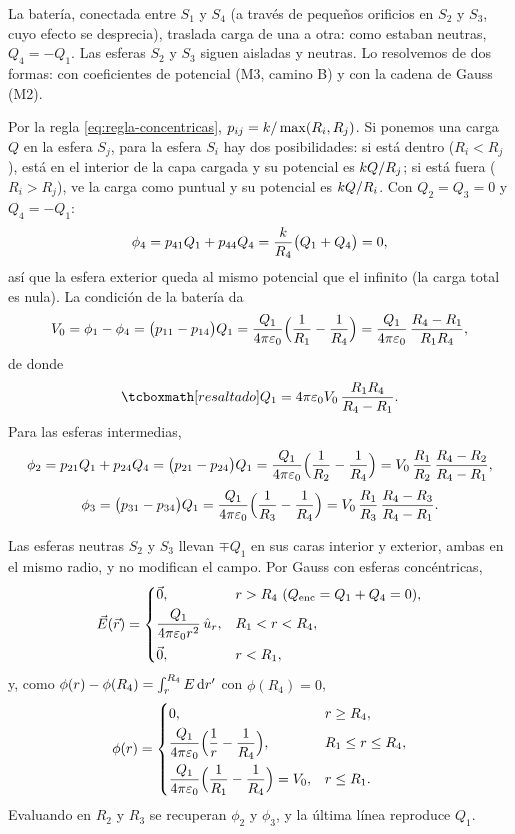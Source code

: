 \begin{resolucion}
 La batería, conectada entre $S_1$ y $S_4$ (a través de pequeños orificios en $S_2$ y $S_3$, cuyo efecto se desprecia), traslada carga de una a otra:
como estaban neutras, $Q_4=-Q_1$. Las esferas $S_2$ y $S_3$ siguen aisladas y neutras. Lo resolvemos de dos formas: con coeficientes de potencial (M3, camino B)
y con la cadena de Gauss (M2).

 Por la regla \eqref{eq:regla-concentricas}, $p_{ij}=k/\max(R_i,R_j)$. Si ponemos una carga $Q$ en la esfera $S_j$,
para la esfera $S_i$ hay dos posibilidades: si está dentro ($R_i<R_j$), está en el interior de la capa cargada y su potencial es $k Q/R_j$; si está fuera
($R_i>R_j$), ve la carga como puntual y su potencial es $k Q/R_i$. Con $Q_2=Q_3=0$ y $Q_4=-Q_1$:
\[
  \phi_4=p_{41}Q_1+p_{44}Q_4=\frac{k}{R_4}\bigl(Q_1+Q_4\bigr)=0 ,
\]
así que la esfera exterior queda al mismo potencial que el infinito (la carga total es nula). La condición de la batería da
\[
  V_0=\phi_1-\phi_4=\bigl(p_{11}-p_{14}\bigr)Q_1=\frac{Q_1}{4\pi\varepsilon_{0}}\Bigl(\frac{1}{R_1}-\frac{1}{R_4}\Bigr)=\frac{Q_1}{4\pi\varepsilon_{0}}\,\frac{R_4-R_1}{R_1R_4},
\]
de donde
\[
  \resalta{Q_1=4\pi\eo V_0\,\frac{R_1R_4}{R_4-R_1}.}
\]
Para las esferas intermedias,
\[
  \phi_2=p_{21}Q_1+p_{24}Q_4=\bigl(p_{21}-p_{24}\bigr)Q_1=\frac{Q_1}{4\pi\varepsilon_{0}}\Bigl(\frac{1}{R_2}-\frac{1}{R_4}\Bigr)=V_0\,\frac{R_1}{R_2}\,\frac{R_4-R_2}{R_4-R_1},
\]
\[
  \phi_3=\bigl(p_{31}-p_{34}\bigr)Q_1=\frac{Q_1}{4\pi\varepsilon_{0}}\Bigl(\frac{1}{R_3}-\frac{1}{R_4}\Bigr)=V_0\,\frac{R_1}{R_3}\,\frac{R_4-R_3}{R_4-R_1}.
\]

 Las esferas neutras $S_2$ y $S_3$ llevan $\mp Q_1$ en sus caras interior y exterior, ambas en el mismo radio, y no modifican el
campo. Por Gauss con esferas concéntricas,
\[
  \vE(\vc{r})=\begin{cases}\vc{0}, & r>R_4\ (\Qenc=Q_1+Q_4=0),\\[3pt] \dfrac{Q_1}{4\pi\eo r^{2}}\,\ur, & R_1<r<R_4,\\[8pt] \vc{0}, & r<R_1 ,\end{cases}
\]
y, como $\phi(r)-\phi(R_4)=\int_r^{R_4}E\,\mathrm{d} r'$ con $\phi(R_4)=0$,
\[
  \phi(r)=\begin{cases}0, & r\ge R_4,\\[3pt] \dfrac{Q_1}{4\pi\varepsilon_{0}}\Bigl(\dfrac1r-\dfrac{1}{R_4}\Bigr), & R_1\le r\le R_4,\\[8pt]
  \dfrac{Q_1}{4\pi\varepsilon_{0}}\Bigl(\dfrac{1}{R_1}-\dfrac{1}{R_4}\Bigr)=V_0, & r\le R_1 .\end{cases}
\]
Evaluando en $R_2$ y $R_3$ se recuperan $\phi_2$ y $\phi_3$, y la última línea reproduce $Q_1$.
\end{resolucion}

